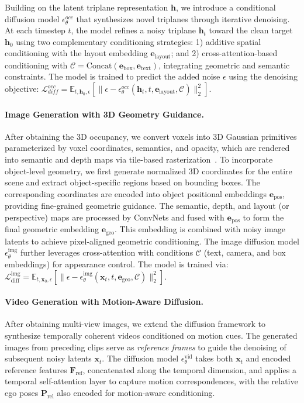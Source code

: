 Building on the latent triplane representation $\mathbf{h}$, we introduce a conditional diffusion model $\epsilon_{\theta}^\textit{occ}$ that synthesizes novel triplanes through iterative denoising. At each timestep $t$, the model refines a noisy triplane $\mathbf{h}_t$ toward the clean target $\mathbf{h}_0$ using two complementary conditioning strategies: 1) additive spatial conditioning with the layout embedding $\mathbf{e}_\text{layout}$; and 2) cross-attention-based conditioning with $\mathcal{C} = \text{Concat}(\mathbf{e}_\text{box}, \mathbf{e}_\text{text})$, integrating geometric and semantic constraints. The model is trained to predict the added noise $\epsilon$ using the denoising objective: 
$ \mathcal{L}_\textit{diff}^\textit{occ} = \mathbb{E}_{t,\mathbf{h}_0,\epsilon} \left[ \| \epsilon - \epsilon_{\theta}^\textit{occ}(\mathbf{h}_t, t, \mathbf{e}_\text{layout}, \mathcal{C}) \|_2^2 \right] $.


\paragraph{Image Generation with 3D Geometry Guidance.}
After obtaining the 3D occupancy, we convert voxels into 3D Gaussian primitives parameterized by voxel coordinates, semantics, and opacity, which are rendered into semantic and depth maps via tile-based rasterization~\cite{3DGS}. 
To incorporate object-level geometry, we first generate normalized 3D coordinates for the entire scene and extract object-specific regions based on bounding boxes. The corresponding coordinates are encoded into object positional embeddings $\mathbf{e}_\text{pos}$, providing fine-grained geometric guidance.
The semantic, depth, and layout (or perspective) maps are processed by ConvNets and fused with $\mathbf{e}_\text{pos}$ to form the final geometric embedding $\mathbf{e}_\text{geo}$. This embedding is combined with noisy image latents to achieve pixel-aligned geometric conditioning.
The image diffusion model $\epsilon_{\theta}^{\text{img}}$ further leverages cross-attention with conditions $\mathcal{C}$ (text, camera, and box embeddings) for appearance control. The model is trained via:
$\mathcal{L}_{\text{diff}}^{\text{img}} = \mathbb{E}_{t,\mathbf{x}_0,\epsilon} \left[ \| \epsilon - \epsilon_{\theta}^{\text{img}}(\mathbf{x}_t, t, \mathbf{e}_\text{geo}, \mathcal{C}) \|_2^2 \right]$.


\paragraph{Video Generation with Motion-Aware Diffusion.}
After obtaining multi-view images, we extend the diffusion framework to synthesize temporally coherent videos conditioned on motion cues. The generated images from preceding clips serve as \textit{reference frames} to guide the denoising of subsequent noisy latents $\mathbf{x}_t$. The diffusion model $\epsilon_{\theta}^{\text{vid}}$ takes both $\mathbf{x}_t$ and encoded reference features $\mathbf{F}_{\text{ref}}$, concatenated along the temporal dimension, and applies a temporal self-attention layer to capture motion correspondences, with the relative ego poses $\mathbf{P}_{\text{rel}}$ also encoded for motion-aware conditioning. 

